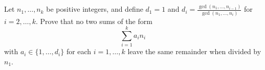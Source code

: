 Let $n_1,\ldots,n_k$ be positive integers, and define $d_1=1$ and $d_i=\frac{\gcd(n_1,\ldots,n_{i-1})}{\gcd(n_1,\ldots,n_{i})}$ for $i=2,\ldots,k$. Prove that no two sums of the form \[\sum_{i=1}^ka_in_i\] with $a_i\in\{1,\ldots,d_i\}$ for each $i=1,\ldots,k$ leave the same remainder when divided by $n_1$.